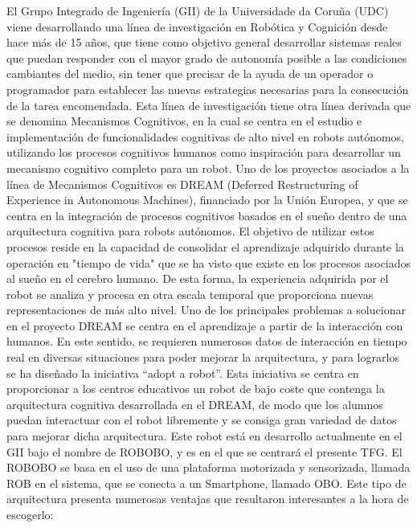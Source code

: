 El Grupo Integrado de Ingeniería (GII) de la Universidade da Coruña (UDC) viene desarrollando una línea de investigación en Robótica y Cognición desde hace más de 15 años, que tiene como objetivo general desarrollar sistemas reales que puedan responder con el mayor grado de autonomía posible a las condiciones cambiantes del medio, sin tener que precisar de la ayuda de un operador o programador para establecer las nuevas estrategias necesarias para la consecución de la tarea encomendada. Esta línea de investigación tiene otra línea derivada que se denomina Mecanismos Cognitivos, en la cual se centra en el estudio e implementación de funcionalidades cognitivas de alto nivel en robots autónomos, utilizando los procesos cognitivos humanos como inspiración para desarrollar un mecanismo cognitivo completo para un robot. 
Uno de los proyectos asociados a la línea de Mecanismos Cognitivos es DREAM\cite{dream_project} (Deferred Restructuring of Experience in Autonomous Machines), financiado por la Unión Europea, y que se centra en la integración de procesos cognitivos basados en el sueño dentro de una arquitectura cognitiva para robots autónomos. El objetivo de utilizar estos procesos reside en la capacidad de consolidar el aprendizaje adquirido durante la operación en "tiempo de vida" que se ha visto que existe en los procesos asociados al sueño en el cerebro humano. De esta forma, la experiencia adquirida por el robot se analiza y procesa en otra escala temporal que proporciona nuevas representaciones de más alto nivel. 
Uno de los principales problemas a solucionar en el proyecto DREAM se centra en el aprendizaje a partir de la interacción con humanos. En este sentido, se requieren numerosos datos de interacción en tiempo real en diversas situaciones para poder mejorar la arquitectura, y para lograrlos se ha diseñado la iniciativa \enquote{adopt a robot}. Esta iniciativa se centra en proporcionar a los centros educativos un robot de bajo coste que contenga la arquitectura cognitiva desarrollada en el DREAM, de modo que los alumnos puedan interactuar con el robot libremente y se consiga gran variedad de datos para mejorar dicha arquitectura. Este robot está en desarrollo actualmente en el GII bajo el nombre de ROBOBO, y es en el que se centrará el presente TFG.
 El ROBOBO se basa en el uso de una plataforma motorizada y sensorizada, llamada ROB en el sistema, que se conecta a un Smartphone, llamado OBO. Este tipo de arquitectura presenta numerosas ventajas que resultaron interesantes a la hora de escogerlo:
